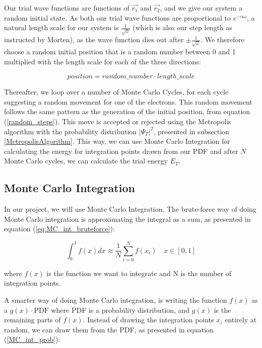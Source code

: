 \documentclass[norsk,a4paper,12pt]{article}
\begin{document}
Our trial wave functions are functions of $\vec{r_1}$ and $\vec{r_2}$, and we give our system a random initial state. As both our trial wave functions are proportional to $e^{-\alpha \omega}$, a natural length scale for our system is $\frac{1}{\sqrt{\omega}}$ (which is also our step length as instructed by Morten), as the wave function dies out after $\pm \frac{1}{\sqrt{\omega}}$. We therefore choose a random initial position that is a random number between 0 and 1 multiplied with the length scale for each of the three directions:

\begin{equation}
    position =  random\_number \cdot length\_scale
    \label{random_steps}
\end{equation}

Thereafter, we loop over a number of Monte Carlo Cycles, for each cycle suggesting a random movement for one of the electrons. This random movement follows the same pattern as the generation of the initial position, from equation (\ref{random_steps}). This move is accepted or rejected using the Metropolis algorithm with the probability distribution $|\Psi_T|^2$, presented in subsection \ref{MetropolisAlgorithm}. This way, we can use Monte Carlo Integration for calculating the energy for integration points drawn from our PDF and after $N$ Monte Carlo cycles, we can calculate the trial energy $E_T$.

\subsection{Monte Carlo Integration}
In our project, we will use Monte Carlo Integration. The brute-force way of doing Monte Carlo integration is approximating the integral as a sum, as presented in equation (\ref{eq:MC_int_bruteforce}):

\begin{equation}
    \int_0^1 f(x) dx \approx  \frac{1}{N}\sum_{i=0}^N f(x_i) \quad x \in [0,1]
    \label{eq:MC_int_bruteforce}
\end{equation}

where $f(x)$ is the function we want to integrate and N is the number of integration points. 

A smarter way of doing Monte Carlo integration, is writing the function $f(x)$ as a $g(x)\cdot \text{PDF}$ where PDF is a probability distribution, and $g(x)$ is the remaining parts of $f(x)$. Instead of drawing the integration points $x_i$ entirely at random, we can draw them from the PDF, as presented in equation (\ref{MC_int_prob}):
\end{document}
